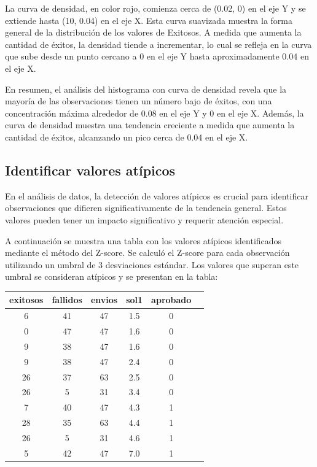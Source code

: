La curva de densidad, en color rojo, comienza cerca de (0.02, 0) en el eje Y y se extiende hasta
(10, 0.04) en el eje X. Esta curva suavizada muestra la forma general de la distribución de los
valores de Exitosos. A medida que aumenta la cantidad de éxitos, la densidad tiende a
incrementar, lo cual se refleja en la curva que sube desde un punto cercano a 0 en el eje Y
hasta aproximadamente 0.04 en el eje X.

En resumen, el análisis del histograma con curva de densidad revela que la mayoría de las
observaciones tienen un número bajo de éxitos, con una concentración máxima alrededor de 0.08 en
el eje Y y 0 en el eje X. Además, la curva de densidad muestra una tendencia creciente a medida
que aumenta la cantidad de éxitos, alcanzando un pico cerca de 0.04 en el eje X.

\subsection{Identificar valores atípicos}

En el análisis de datos, la detección de valores atípicos es crucial para identificar
observaciones que difieren significativamente de la tendencia general. Estos valores pueden
tener un impacto significativo y requerir atención especial.

A continuación se muestra una tabla con los valores atípicos identificados mediante el método
del Z-score. Se calculó el Z-score para cada observación utilizando un umbral de 3 desviaciones
estándar.
Los valores que superan este umbral se consideran atípicos y se presentan en la tabla:

\begin{table}[ht]
    \centering
    \begin{tabular}{cccccc}
    \hline
    \textbf{exitosos} & \textbf{fallidos} & \textbf{envios} & \textbf{sol1} & \textbf{aprobado} \\
    \hline
    6 & 41 & 47 & 1.5 & 0 \\
    0 & 47 & 47 & 1.6 & 0 \\
    9 & 38 & 47 & 1.6 & 0 \\
    9 & 38 & 47 & 2.4 & 0 \\
    26 & 37 & 63 & 2.5 & 0 \\
    26 & 5 & 31 & 3.4 & 0 \\
    7 & 40 & 47 & 4.3 & 1 \\
    28 & 35 & 63 & 4.4 & 1 \\
    26 & 5 & 31 & 4.6 & 1 \\
    5 & 42 & 47 & 7.0 & 1 \\
    \hline
    \end{tabular}
    \label{tab:valores_atipicos}
    \end{table}

